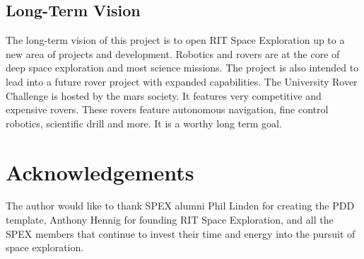 \documentclass[conference]{IEEEtran} %
\begin{document}
\subsection{Long-Term Vision}
\label{sec:vision}
The long-term vision of this project is to open RIT Space Exploration up to a new area of projects and development. 
Robotics and rovers are at the core of deep space exploration and most science missions. 
The project is also intended to lead into a future rover project with expanded capabilities.
The University Rover Challenge is hosted by the mars society. 
It features very competitive and expensive rovers. 
These rovers feature autonomous navigation, fine control robotics, scientific drill and more. 
It is a worthy long term goal. 


\section*{Acknowledgements}
The author would like to thank SPEX alumni Phil Linden for creating the PDD template, Anthony Hennig for founding RIT Space Exploration, and all the SPEX members that continue to invest their time and energy into the pursuit of space exploration.

\onecolumn
\appendices{}
\end{document}
